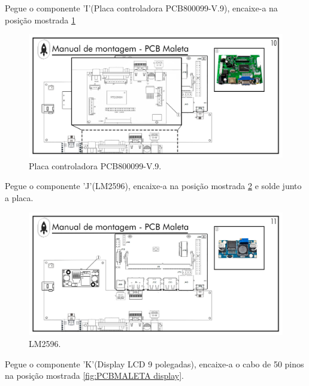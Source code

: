 \par Pegue o componente 'I'(Placa controladora PCB800099-V.9), encaixe-a na posição mostrada \ref{fig:PCBMALETA PCB800099} 

\begin{figure}[H]
  \centering
  \includegraphics[width=\textwidth]{Figuras/MALETA/Pg-10---PL-01.png}
  \caption{Placa controladora PCB800099-V.9.}
  \label{fig:PCBMALETA PCB800099}
\end{figure}

\newpage
\par Pegue o componente 'J'(LM2596), encaixe-a na posição mostrada \ref{fig:PCBMALETA LM2596} e solde junto a placa.
\begin{figure}[H]
  \centering
  \includegraphics[width=\textwidth]{Figuras/MALETA/Pg-11---PL-01.png}
  \caption{LM2596.}
  \label{fig:PCBMALETA LM2596}
\end{figure}



\par Pegue o componente 'K'(Display LCD 9 polegadas), encaixe-a o cabo de 50 pinos na posição mostrada \ref{fig:PCBMALETA display}.


